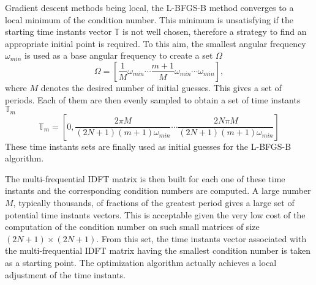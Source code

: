 Gradient descent methods being local, the L-BFGS-B method converges to a local
minimum of the condition number. This minimum is unsatisfying if the
starting time instants vector $\mathbb{T}$ is not well chosen, therefore a strategy
to find an appropriate initial point is required. To this aim, the smallest
angular frequency $\omega_{min}$ is used as a base angular frequency to create a set $\Omega$
\begin{equation}
    \Omega = [\frac{1}{M} \omega_{min} \cdots \frac{m+1}{M} \omega_{min} \cdots \omega_{min}],
    \label{eq:slitted_period}
\end{equation}
where $M$ denotes the desired number of initial guesses.
This gives a set of periods. Each of them are then evenly sampled to obtain a
set of time instants $\mathbb{T}_m$
\begin{equation}
    \mathbb{T}_m = \left[ 0, \frac{2 \pi M}{ (2N + 1) (m+1) \omega_{min}} \cdots 
                             \frac{2N \pi M}{ (2N + 1) (m+1) \omega_{min}} \right]
    \label{eq:set_of_tlv}
\end{equation}
These time instants sets are finally used as initial guesses for the
L-BFGS-B algorithm.

The multi-frequential IDFT matrix is then built for
each one of these time instants and the corresponding condition numbers are
computed. A large number $M$, typically thousands, of fractions of the
greatest period gives a large set of potential time instants vectors.
This is acceptable given the very low cost of the computation of the
condition number on such small matrices of size $(2N + 1) \times
(2N+1)$.  From this set, the time instants vector associated with the
multi-frequential IDFT matrix having the smallest condition number is
taken as a starting point.  The optimization algorithm actually achieves
a local adjustment of the time instants.

